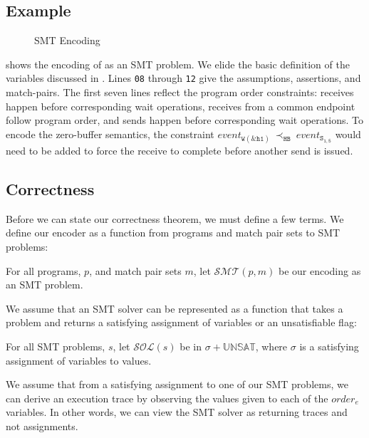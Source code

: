 \subsection{Example}

\begin{figure}[t]
\begin{center}
\usebox{\boxSMTc}
\end{center}
\caption{SMT Encoding} \label{fig:smt-encode}
\end{figure}

 shows the encoding of  as an
SMT problem. We elide the basic definition of the variables discussed
in . Lines \texttt{08} through \texttt{12} give
the assumptions, assertions, and match-pairs. The first seven lines
reflect the program order constraints: receives happen before
corresponding wait operations, receives from a common endpoint follow
program order, and sends happen before corresponding wait
operations. To encode the zero-buffer semantics, the constraint
$\mathit{event}_\mathtt{W(\&h1)}\ \mathrm{\prec_\mathtt{HB}}\ \mathit{event}_\mathtt{S_{1,5}}$
would need to be added to force the receive to complete before another
send is issued.

\subsection{Correctness}

Before we can state our correctness theorem, we must define a few
terms. We define our encoder as a function from programs and match pair sets
to SMT problems:

\begin{definition}[Encoder]
For all programs, $p$, and match pair sets $m$, let $\mathcal{SMT}(p,
m)$ be our encoding as an SMT problem.
\end{definition}

We assume that an SMT solver can be represented as a function that
takes a problem and returns a satisfying assignment of variables or an
unsatisfiable flag:

\begin{definition}
For all SMT problems, $s$, let $\mathcal{SOL}(s)$ be in $\sigma +
\mathbb{UNSAT}$, where $\sigma$ is a satisfying assignment of
variables to values.
\end{definition}

We assume that from a satisfying assignment to one of our SMT
problems, we can derive an execution trace by observing the values
given to each of the $\textit{order}_{e}$ variables. In other words,
we can view the SMT solver as returning traces and not assignments.

